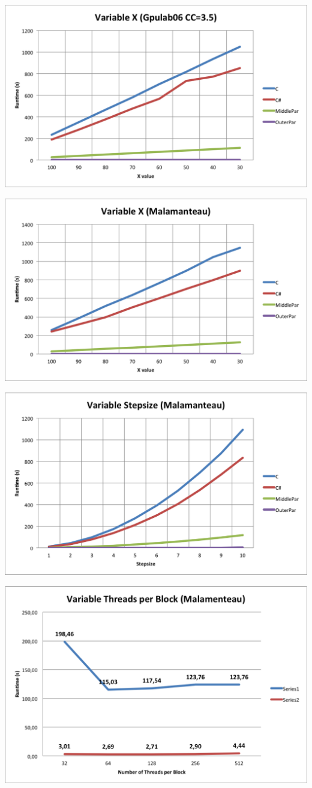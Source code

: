 \centerline{\includegraphics[width=\textwidth]{img/Gpulab-varx35.png}}

\centerline{\includegraphics[width=\textwidth]{img/Malamanteau-varx.png}}

\centerline{\includegraphics[width=\textwidth]{img/Malamanteau-stepsize.png}}

\centerline{\includegraphics[width=\textwidth]{img/Malamanteau-tpb.png}}